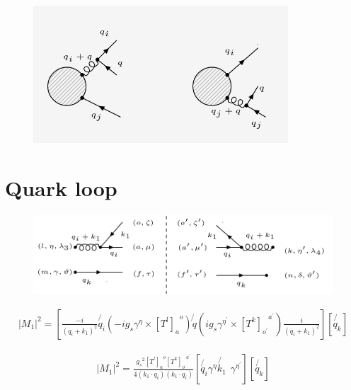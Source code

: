 
\begin{figure}[ht!]
\centering
\includegraphics[width=0.85\textwidth]{images/QG/QGDiagrams.png}
\end{figure}
\pagebreak

\section{Quark loop}
\begin{figure}[ht!]
\centering
\includegraphics[scale=0.7]{images/QG/M1Squer.png}
\end{figure}

\begin{equation}
\begin{split}
|M_1|^2=[\frac{-i}{(q_i +k_1)^2}\not{q_i}(-ig_s {\gamma}^{\eta}\times{[T^l]_a}^o)\not{q}(ig_s {\gamma}^{{\eta}^{\prime}}\times{[T^k]_{o^{\prime}}}^{a^{\prime}})\frac{i}{(q_i +k_1)^2}][\not{q_k}]
\end{split}
\end{equation}


\begin{equation}
\begin{split}
|M_1|^2=\frac{{g_s}^2 {[T^l]_a}^o {[T^k]_{o^{\prime}}}^{a^{\prime}}}{4(k_1 \cdot q_i)(k_1 \cdot q_i)}[\not{q_i}{\gamma}^{\eta}\not{k_1}\:\: {\gamma}^{{\eta}^{\prime}}][\not{q_k}]
\end{split}
\end{equation}

